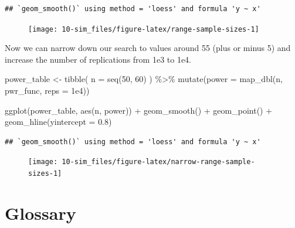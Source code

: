 \documentclass[
  oneside]{book}
\newenvironment{Shaded}{\begin{snugshade}}{\end{snugshade}}
\newcommand{\AttributeTok}[1]{\textcolor[rgb]{0.77,0.63,0.00}{#1}}
\newcommand{\DecValTok}[1]{\textcolor[rgb]{0.00,0.00,0.81}{#1}}
\newcommand{\FloatTok}[1]{\textcolor[rgb]{0.00,0.00,0.81}{#1}}
\newcommand{\FunctionTok}[1]{\textcolor[rgb]{0.00,0.00,0.00}{#1}}
\newcommand{\NormalTok}[1]{#1}
\newcommand{\OtherTok}[1]{\textcolor[rgb]{0.56,0.35,0.01}{#1}}
\newcommand{\SpecialCharTok}[1]{\textcolor[rgb]{0.00,0.00,0.00}{#1}}
\begin{document}
\begin{verbatim}
## `geom_smooth()` using method = 'loess' and formula 'y ~ x'
\end{verbatim}

\begin{figure}

{\centering \texttt{[image: 10-sim\_files/figure-latex/range-sample-sizes-1]} 

}

\end{figure}

Now we can narrow down our search to values around 55 (plus or minus 5) and increase the number of replications from 1e3 to 1e4.

\begin{Shaded}
\begin{Highlighting}[]
\NormalTok{power\_table }\OtherTok{\textless{}{-}} \FunctionTok{tibble}\NormalTok{(}
  \AttributeTok{n =} \FunctionTok{seq}\NormalTok{(}\DecValTok{50}\NormalTok{, }\DecValTok{60}\NormalTok{)}
\NormalTok{) }\SpecialCharTok{\%\textgreater{}\%}
  \FunctionTok{mutate}\NormalTok{(}\AttributeTok{power =} \FunctionTok{map\_dbl}\NormalTok{(n, pwr\_func, }\AttributeTok{reps =} \FloatTok{1e4}\NormalTok{))}

\FunctionTok{ggplot}\NormalTok{(power\_table, }\FunctionTok{aes}\NormalTok{(n, power)) }\SpecialCharTok{+}
 \FunctionTok{geom\_smooth}\NormalTok{() }\SpecialCharTok{+}
 \FunctionTok{geom\_point}\NormalTok{() }\SpecialCharTok{+}
 \FunctionTok{geom\_hline}\NormalTok{(}\AttributeTok{yintercept =} \FloatTok{0.8}\NormalTok{)}
\end{Highlighting}
\end{Shaded}

\begin{verbatim}
## `geom_smooth()` using method = 'loess' and formula 'y ~ x'
\end{verbatim}

\begin{figure}

{\centering \texttt{[image: 10-sim\_files/figure-latex/narrow-range-sample-sizes-1]} 

}

\end{figure}

\hypertarget{glossary-sim}{%
\section{Glossary}\label{glossary-sim}}
\end{document}
